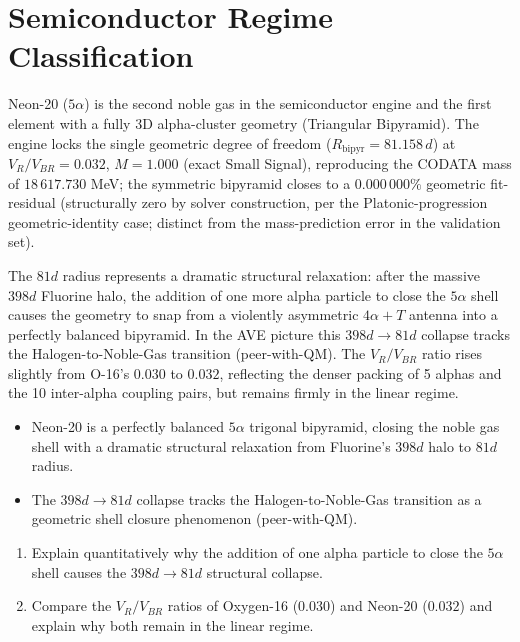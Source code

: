 \section{Semiconductor Regime Classification}
Neon-20 ($5\alpha$) is the second noble gas in the semiconductor engine and the first element with a fully 3D alpha-cluster geometry (Triangular Bipyramid). The engine locks the single geometric degree of freedom ($R_{\text{bipyr}} = 81.158\,d$) at $V_R/V_{BR} = 0.032$, $M = 1.000$ (exact Small Signal), reproducing the CODATA mass of $18\,617.730$ MeV; the symmetric bipyramid closes to a $0.000\,000\%$ geometric fit-residual (structurally zero by solver construction, per the Platonic-progression geometric-identity case; distinct from the mass-prediction error in the validation set).

The $81d$ radius represents a dramatic structural relaxation: after the massive $398d$ Fluorine halo, the addition of one more alpha particle to close the $5\alpha$ shell causes the geometry to snap from a violently asymmetric $4\alpha+T$ antenna into a perfectly balanced bipyramid. In the AVE picture this $398d \to 81d$ collapse tracks the Halogen-to-Noble-Gas transition (peer-with-QM). The $V_R/V_{BR}$ ratio rises slightly from O-16's $0.030$ to $0.032$, reflecting the denser packing of 5 alphas and the 10 inter-alpha coupling pairs, but remains firmly in the linear regime.

\begin{summarybox}
\begin{itemize}
    \item Neon-20 is a perfectly balanced $5\alpha$ trigonal bipyramid, closing the noble gas shell with a dramatic structural relaxation from Fluorine's $398d$ halo to $81d$ radius.
    \item The $398d \to 81d$ collapse tracks the Halogen-to-Noble-Gas transition as a geometric shell closure phenomenon (peer-with-QM).
\end{itemize}
\end{summarybox}

\begin{exercisebox}
\begin{enumerate}
    \item Explain quantitatively why the addition of one alpha particle to close the $5\alpha$ shell causes the $398d \to 81d$ structural collapse.
    \item Compare the $V_R/V_{BR}$ ratios of Oxygen-16 ($0.030$) and Neon-20 ($0.032$) and explain why both remain in the linear regime.
\end{enumerate}
\end{exercisebox}


